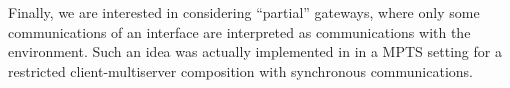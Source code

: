 
 Finally, we are interested in considering “partial” gateways, where only some communications of an interface are interpreted as communications with the environment.
Such an idea was actually implemented in \cite{BDL22,BBD25} in a MPTS setting for a restricted client-multiserver composition with synchronous communications.


 




